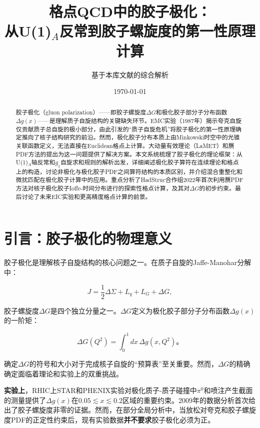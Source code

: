 \documentclass[12pt,a4paper]{ctexart}
\title{\heiti 格点QCD中的胶子极化：\\
从U(1)$_A$反常到胶子螺旋度的第一性原理计算}
\author{基于本库文献的综合解析}
\date{\today}
\theoremstyle{definition}
\begin{document}
\maketitle

\begin{abstract}
\noindent
胶子极化（gluon polarization）——即胶子螺旋度$\Delta G$和极化胶子部分子分布函数$\Delta g(x)$——是理解质子自旋结构的关键缺失环节。EMC实验（1987年）揭示夸克自旋仅贡献质子总自旋的极小部分，由此引发的``质子自旋危机''将胶子极化的第一性原理确定推向了核子结构研究的前沿。然而，极化胶子分布本质上由Minkowski时空中的光锥关联函数定义，无法直接在Euclidean格点上计算。大动量有效理论（LaMET）和赝PDF方法的提出为这一问题提供了解决方案。本文系统梳理了胶子极化的理论框架：从U(1)$_A$轴反常和$g_1$自旋求和规则的解析出发，详细阐述极化胶子算符在连续理论和格点上的构造，讨论非极化与极化胶子PDF之间算符结构的本质区别，并介绍混合重整化和微扰匹配在极化胶子计算中的应用。重点分析了HadStruc合作组2022年首次利用赝PDF方法对核子极化胶子Ioffe-时间分布进行的探索性格点计算，及其对$\Delta G$的初步约束。最后讨论了未来EIC实验和更高精度格点计算的前景。
\end{abstract}

\tableofcontents
\newpage

\section{引言：胶子极化的物理意义}

胶子极化是理解核子自旋结构的核心问题之一。在质子自旋的Jaffe-Manohar分解中\cite{JaffeManohar1990}：

\begin{equation}
J = \frac{1}{2}\Delta\Sigma + L_q + L_G + \Delta G,
\label{eq:JM_decomp}
\end{equation}

胶子螺旋度$\Delta G$是四个独立分量之一。$\Delta G$定义为极化胶子部分子分布函数$\Delta g(x)$的一阶矩：

\begin{equation}
\Delta G(Q^2) = \int_0^1 dx\, \Delta g(x, Q^2)。
\label{eq:DeltaG_def}
\end{equation}

确定$\Delta G$的符号和大小对于完成核子自旋的``预算表''至关重要。然而，$\Delta G$的精确确定面临着理论和实验上的双重挑战。

\textbf{实验上}，RHIC上STAR和PHENIX实验对极化质子-质子碰撞中$\pi^0$和喷注产生截面的测量提供了$\Delta g(x)$在$0.05 \lesssim x \lesssim 0.2$区域的重要约束。2009年的数据分析首次给出了胶子螺旋度非零的证据\cite{DSSV14}。然而，在部分全局分析中，当放松对夸克和胶子螺旋度PDF的正定性约束后，现有实验数据\textbf{并不要求}胶子极化必须为正\cite{JAM24}。
\end{document}
